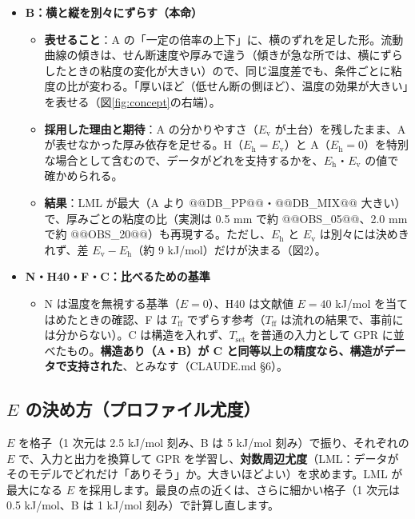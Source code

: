 \documentclass[paper=a4paper,fontsize=10.5pt,line_length=44zw,number_of_lines=38]{jlreq}
\newcommand{\Tff}{T_{\mathrm{ff}}}
\newcommand{\Tset}{T_{\mathrm{set}}}
\newcommand{\Eh}{E_{\mathrm{h}}}
\newcommand{\Ev}{E_{\mathrm{v}}}
\newenvironment{points}{\begin{itemize}[label=$\triangleright$,leftmargin=1.5\zw,itemsep=0.3ex,topsep=0.5ex,parsep=0pt]}{\end{itemize}}
\newcommand{\ptn}[1]{\item \textbf{#1}}
\begin{document}
\begin{points}
\begin{itemize}[leftmargin=1.5\zw,itemsep=0.2ex,topsep=0.2ex,parsep=0pt]
  \item \textbf{採用した理由と期待}：対照。「横のずれだけで、温度の効果を表せるか」を確かめる。
  \item \textbf{結果}：$\Eh$ が負（PP：@@EHZ_PP@@、粉砕材混合 PP：@@EHZ_MIX@@ kJ/mol）に決まり、「低温ほど、同じ粘度になるせん断速度が大きい」ことになって、物理的に解釈しにくい。LML も A に劣る。
  \end{itemize}
\ptn{B：横と縦を別々にずらす（本命）}
  \begin{itemize}[leftmargin=1.5\zw,itemsep=0.2ex,topsep=0.2ex,parsep=0pt]
  \item \textbf{表せること}：A の「一定の倍率の上下」に、横のずれを足した形。流動曲線の傾きは、せん断速度や厚みで違う（傾きが急な所では、横にずらしたときの粘度の変化が大きい）ので、同じ温度差でも、条件ごとに粘度の比が変わる。「厚いほど（低せん断の側ほど）、温度の効果が大きい」を表せる（図\ref{fig:concept}の右端）。
  \item \textbf{採用した理由と期待}：A の分かりやすさ（$\Ev$ が土台）を残したまま、A が表せなかった厚み依存を足せる。H（$\Eh=\Ev$）と A（$\Eh=0$）を特別な場合として含むので、データがどれを支持するかを、$\Eh$・$\Ev$ の値で確かめられる。
  \item \textbf{結果}：LML が最大（A より @@DB_PP@@・@@DB_MIX@@ 大きい）で、厚みごとの粘度の比（実測は 0.5 mm で約 @@OBS_05@@、2.0 mm で約 @@OBS_20@@）も再現する。ただし、$\Eh$ と $\Ev$ は別々には決めきれず、差 $\Ev-\Eh$（約 9 kJ/mol）だけが決まる（図2）。
  \end{itemize}
\ptn{N・H40・F・C：比べるための基準}
  \begin{itemize}[leftmargin=1.5\zw,itemsep=0.2ex,topsep=0.2ex,parsep=0pt]
  \item N は温度を無視する基準（$E=0$）、H40 は文献値 $E=40$ kJ/mol を当てはめたときの確認、F は $\Tff$ でずらす参考（$\Tff$ は流れの結果で、事前には分からない）。C は構造を入れず、$\Tset$ を普通の入力として GPR に並べたもの。\textbf{構造あり（A・B）が C と同等以上の精度なら、構造がデータで支持された}、とみなす（CLAUDE.md §6）。
  \end{itemize}
\end{points}

\subsection{$E$ の決め方（プロファイル尤度）}
$E$ を格子（1 次元は 2.5 kJ/mol 刻み、B は 5 kJ/mol 刻み）で振り、それぞれの $E$ で、入力と出力を換算して GPR を学習し、\textbf{対数周辺尤度}（LML：データがそのモデルでどれだけ「ありそう」か。大きいほどよい）を求めます。LML が最大になる $E$ を採用します。最良の点の近くは、さらに細かい格子（1 次元は 0.5 kJ/mol、B は 1 kJ/mol 刻み）で計算し直します。
\end{document}
